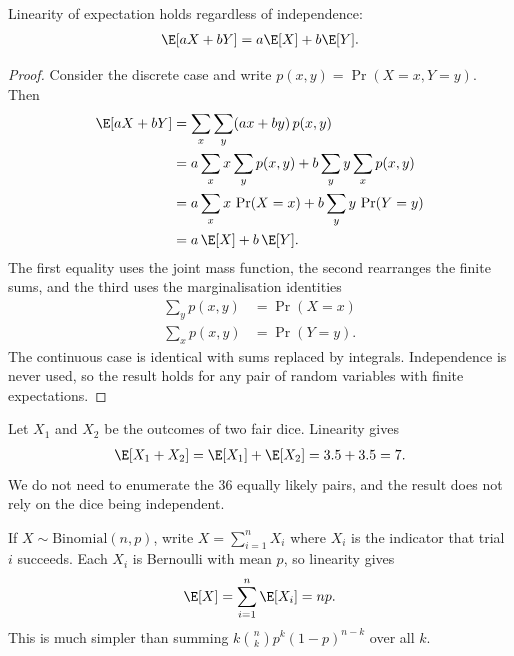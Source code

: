 \documentclass[a4paper, 12pt]{book}
\begin{document}
\begin{proposition}
    Linearity of expectation holds regardless of independence:
    \begin{align}
        \E[aX + bY] = a\E[X] + b\E[Y].
    \end{align}
\end{proposition}
\begin{proof}
    Consider the discrete case and write $p(x,y)=\Pr(X=x,Y=y)$. Then
    \begin{align}
        \E[aX+bY]
        &= \sum_x\sum_y (ax+by)\,p(x,y)\\
        &= a\sum_x x\sum_y p(x,y) + b\sum_y y\sum_x p(x,y)\\
        &= a\sum_x x\,\Pr(X=x) + b\sum_y y\,\Pr(Y=y)\\
        &= a\,\E[X] + b\,\E[Y].
    \end{align}
    The first equality uses the joint mass function, the second rearranges the finite sums, and the third uses the marginalisation identities
    \begin{align}
        \sum_y p(x,y) &= \Pr(X=x) \\
        \sum_x p(x,y) &= \Pr(Y=y).
    \end{align}
    The continuous case is identical with sums replaced by integrals. Independence is never used, so the result holds for any pair of random variables with finite expectations.
\end{proof}
\begin{example}
    Let $X_1$ and $X_2$ be the outcomes of two fair dice. Linearity gives
    \begin{align}
        \E[X_1+X_2] = \E[X_1]+\E[X_2]
        = 3.5+3.5 = 7.
    \end{align}
    We do not need to enumerate the $36$ equally likely pairs, and the result
    does not rely on the dice being independent.
\end{example}

\begin{example}
    If $X\sim\mathrm{Binomial}(n,p)$, write $X=\sum_{i=1}^n X_i$ where $X_i$ is
    the indicator that trial $i$ succeeds. Each $X_i$ is Bernoulli with mean $p$,
    so linearity gives
    \begin{align}
        \E[X] = \sum_{i=1}^n \E[X_i] = np.
    \end{align}
    This is much simpler than summing $k\binom{n}{k}p^k(1-p)^{n-k}$ over all $k$.
\end{example}
\end{document}
